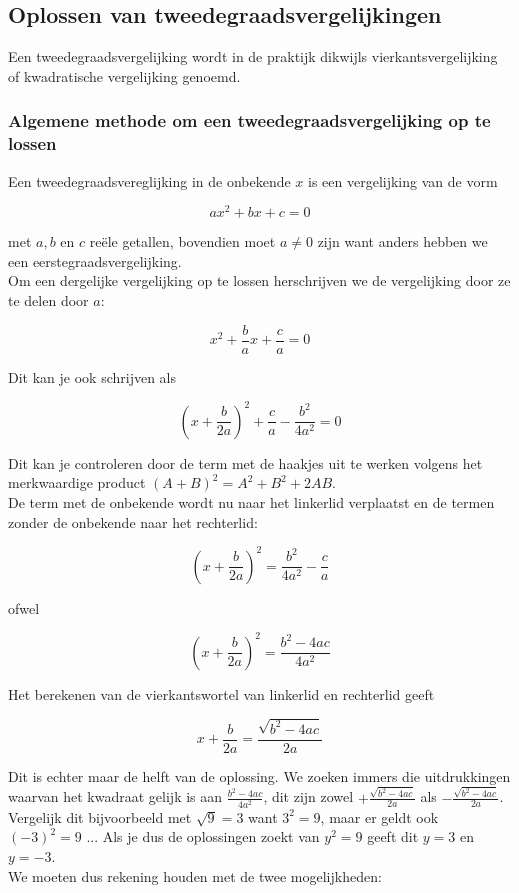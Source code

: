 \subsection{Oplossen van tweedegraadsvergelijkingen}


Een tweedegraadsvergelijking wordt in de praktijk dikwijls vierkantsvergelijking of kwadratische vergelijking genoemd.

\subsubsection{Algemene methode om een tweedegraadsvergelijking op te lossen}

Een tweedegraadsvereglijking in de onbekende $x$ is een vergelijking van de vorm

\[ ax^2 + bx + c = 0 \]

met $a,b$ en $c$ re\"{e}le getallen, bovendien moet $a \neq 0$ zijn want anders hebben we een eerstegraadsvergelijking.\\
Om een dergelijke vergelijking op te lossen herschrijven we de vergelijking door ze te delen door $a$:

\[ x^2 + \frac{b}{a}x + \frac{c}{a} = 0 \]

Dit kan je ook schrijven als

\[ (x+ \frac{b}{2a})^2 + \frac{c}{a} - \frac{b^2}{4a^2} = 0 \]

Dit kan je controleren door de term met de haakjes uit te werken volgens het merkwaardige product $(A+B)^2 =A^2 + B^2 + 2AB $.\\
De term met de onbekende wordt nu naar het linkerlid verplaatst en de termen zonder de onbekende naar het rechterlid:

\[  (x+ \frac{b}{2a})^2 = \frac{b^2}{4a^2} - \frac{c}{a} \]

ofwel

\[ (x+ \frac{b}{2a})^2 = \frac{b^2 - 4ac}{4a^2} \]

Het berekenen van de vierkantswortel van linkerlid en rechterlid geeft

\[ x+\frac{b}{2a} = \frac{\sqrt{b^2 - 4ac}}{2a} \]

Dit is echter maar de helft van de oplossing. We zoeken immers die uitdrukkingen waarvan het kwadraat gelijk is aan $\frac{b^2 - 4ac}{4a^2}$, dit zijn zowel $+\frac{\sqrt{b^2 - 4ac}}{2a}$ als $-\frac{\sqrt{b^2 - 4ac}}{2a}$. Vergelijk dit bijvoorbeeld met $\sqrt{9}=3$ want $3^2 =9$, maar er geldt ook $(-3)^2 =9$ ... Als je dus de oplossingen zoekt van $y^2 =9$ geeft dit $y=3$ en $y=-3$. \\
We moeten dus rekening houden met de twee mogelijkheden:

